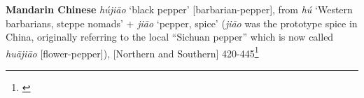 \begin{etymology}\label{ety:hujiao}
\textbf{Mandarin Chinese}  \textit{hú​jiāo} `black pepper' [barbarian-pepper], from  \textit{hú​} `Western barbarians, steppe nomads' +  \textit{jiāo} `pepper, spice' (\textit{jiāo} was the prototype spice in China, originally referring to the local ``Sichuan pepper'' which is now called  \textit{huājiāo} [flower-pepper]), [Northern and Southern] 420-445\footnote{\textcite{schuessler_abc_2007}}
\end{etymology}